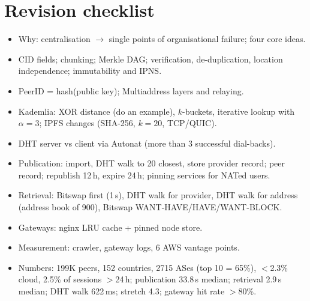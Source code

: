 \section{Revision checklist}
\begin{itemize}
  \item Why: centralisation $\to$ single points of organisational failure; four core ideas.
  \item CID fields; chunking; Merkle DAG; verification, de-duplication, location independence; immutability and IPNS.
  \item PeerID = hash(public key); Multiaddress layers and relaying.
  \item Kademlia: XOR distance (do an example), $k$-buckets, iterative lookup with $\alpha = 3$; IPFS changes (SHA-256, $k=20$, TCP/QUIC).
  \item DHT server vs client via Autonat (more than 3 successful dial-backs).
  \item Publication: import, DHT walk to 20 closest, store provider record; peer record; republish 12\,h, expire 24\,h; pinning services for NATed users.
  \item Retrieval: Bitswap first (1\,s), DHT walk for provider, DHT walk for address (address book of 900), Bitswap WANT-HAVE/HAVE/WANT-BLOCK.
  \item Gateways: nginx LRU cache + pinned node store.
  \item Measurement: crawler, gateway logs, 6 AWS vantage points.
  \item Numbers: 199K peers, 152 countries, 2715 ASes (top 10 = 65\%), $<$2.3\% cloud, 2.5\% of sessions $>$24\,h; publication 33.8\,s median; retrieval 2.9\,s median; DHT walk 622\,ms; stretch 4.3; gateway hit rate $>$80\%.
\end{itemize}
